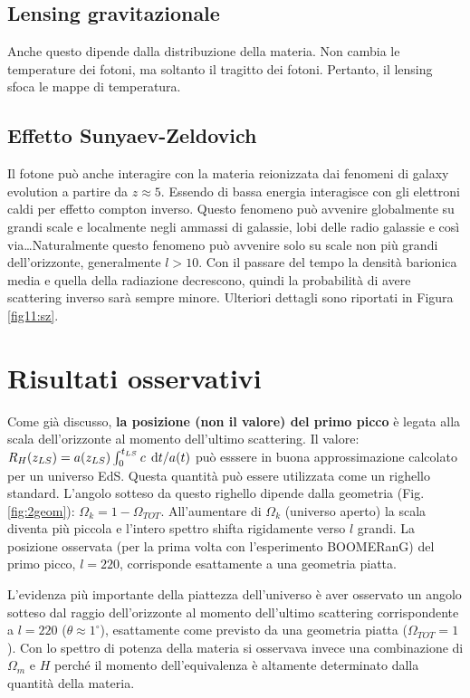 \subsection{Lensing gravitazionale}
Anche questo dipende dalla distribuzione della materia. Non cambia le temperature dei fotoni, ma soltanto il tragitto dei fotoni. Pertanto, il lensing sfoca le mappe di temperatura. 

\subsection{Effetto Sunyaev-Zeldovich}
Il fotone può anche interagire con la materia reionizzata dai fenomeni di galaxy evolution a partire da $z\approx 5$. Essendo di bassa energia interagisce con gli elettroni caldi per effetto compton inverso. Questo fenomeno può avvenire globalmente su grandi scale e localmente negli ammassi di galassie, lobi delle radio galassie e così via\dots Naturalmente questo fenomeno può avvenire solo su scale non più grandi dell'orizzonte, generalmente $l>10$. Con il passare del tempo la densità barionica media e quella della radiazione decrescono, quindi la probabilità di avere scattering inverso sarà sempre minore. Ulteriori dettagli sono riportati in Figura \ref{fig11:sz}.



\section{Risultati osservativi}
Come già discusso, \textbf{la posizione (non il valore) del primo picco} è legata alla scala dell'orizzonte al momento dell'ultimo scattering. Il valore: $R_H(z_{LS})=a(z_{LS})\int_0^{t_{LS}}c \; \operatorname{d}\!{t} / a(t)$ può esssere in buona approssimazione calcolato per un universo EdS. Questa quantità può essere utilizzata come un righello standard. L'angolo sotteso da questo righello dipende dalla geometria (Fig. \ref{fig:2geom}): $\Omega_k = 1-\Omega_{TOT}$. All'aumentare di $\Omega_k$ (universo aperto) la scala diventa più piccola e l'intero spettro shifta rigidamente verso $l$ grandi. La posizione osservata (per la prima volta con l'esperimento BOOMERanG) del primo picco, $l=220$, corrisponde esattamente a una geometria piatta.

\begin{definition}
    L'evidenza più importante della piattezza dell'universo è aver osservato un angolo sotteso dal raggio dell'orizzonte al momento dell'ultimo scattering corrispondente a $l=220$ ($\theta \approx 1^\circ$), esattamente come previsto da una geometria piatta ($\Omega_{TOT}=1$). Con lo spettro di potenza della materia si osservava invece una combinazione di $\Omega_m$ e $H$ perché il momento dell'equivalenza è altamente determinato dalla quantità della materia.
\end{definition}

